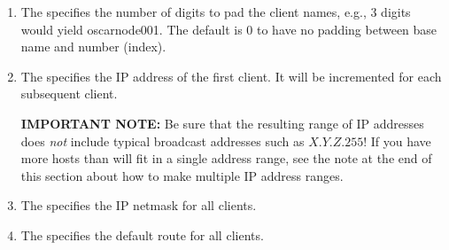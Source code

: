 \begin{enumerate}
\item The  specifies the number of digits to pad the client
names, e.g., 3 digits would yield oscarnode001.  The default is 0 to
have no padding between base name and number (index).

\item The  specifies the IP address of the first
  client. It will be incremented for each subsequent client.


  {\bf IMPORTANT NOTE:} Be sure that the resulting range of IP
  addresses does {\em not} include typical broadcast addresses such as
  $X.Y.Z.255$!  If you have more hosts than will fit in a single
  address range, see the note at the end of this section about how to
  make multiple IP address ranges.

\item The  specifies the IP netmask for all
  clients.  

\item The  specifies the default route for all
  clients.

\end{enumerate}

